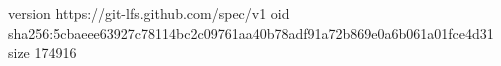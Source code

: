 version https://git-lfs.github.com/spec/v1
oid sha256:5cbaeee63927c78114bc2c09761aa40b78adf91a72b869e0a6b061a01fce4d31
size 174916

